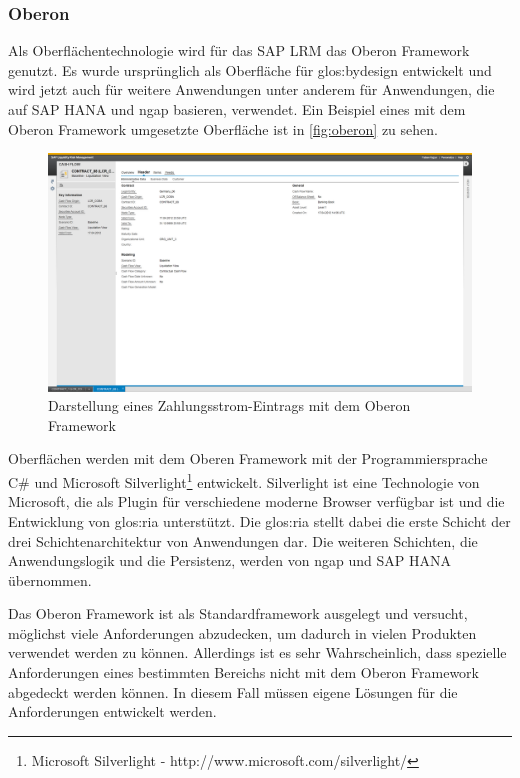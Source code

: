 \begin{onehalfspacing}
\subsubsection{Oberon}
Als Oberflächentechnologie wird für das SAP LRM das Oberon Framework genutzt. Es wurde ursprünglich als Oberfläche für \gls{glos:bydesign} entwickelt und wird jetzt auch für weitere Anwendungen unter anderem für Anwendungen, die auf SAP HANA und \gls{ngap} basieren, verwendet. Ein Beispiel eines mit dem Oberon Framework umgesetzte Oberfläche ist in \vref{fig:oberon} zu sehen.

\begin{figure}[!ht]
\centering
\setlength{\unitlength}{1mm}
\includegraphics[width=15cm]{images/OberonUI.png}
\caption{Darstellung eines Zahlungsstrom-Eintrags mit dem Oberon Framework\label{fig:oberon}}
\end{figure}

Oberflächen werden mit dem Oberen Framework mit der Programmiersprache C\# und Microsoft Silverlight\footnote{Microsoft Silverlight - http://www.microsoft.com/silverlight/} entwickelt. Silverlight ist eine Technologie von Microsoft, die als Plugin für verschiedene moderne Browser verfügbar ist und die Entwicklung von \gls{glos:ria} unterstützt. Die \gls{glos:ria} stellt dabei die erste Schicht der drei Schichtenarchitektur von Anwendungen dar. Die weiteren Schichten, die Anwendungslogik und die Persistenz, werden von \gls{ngap} und SAP HANA übernommen.

Das Oberon Framework ist als Standardframework ausgelegt und versucht, möglichst viele Anforderungen abzudecken, um dadurch in vielen Produkten verwendet werden zu können. Allerdings ist es sehr Wahrscheinlich, dass spezielle Anforderungen eines bestimmten Bereichs nicht mit dem Oberon Framework abgedeckt werden können. In diesem Fall müssen eigene Lösungen für die Anforderungen entwickelt werden.


\end{onehalfspacing}
